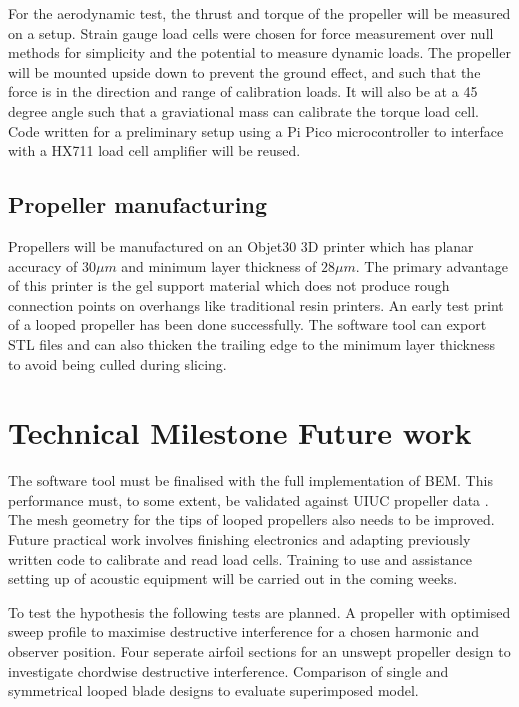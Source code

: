 \documentclass{article}
\begin{document}
For the aerodynamic test, the thrust and torque of the propeller will be measured on a setup.
Strain gauge load cells were chosen for force measurement over null methods for simplicity and the potential to measure dynamic loads.
The propeller will be mounted upside down to prevent the ground effect, and such that the force is in the direction and range of calibration loads.
It will also be at a 45 degree angle such that a graviational mass can calibrate the torque load cell.
Code written for a preliminary setup using a Pi Pico microcontroller to interface with a HX711 load cell amplifier will be reused.

\subsection{Propeller manufacturing}
Propellers will be manufactured on an Objet30 3D printer which has planar accuracy of $30\mu m$ and minimum layer thickness of $28 \mu m$.
The primary advantage of this printer is the gel support material which does not produce rough connection points on overhangs like traditional resin printers.
An early test print of a looped propeller has been done successfully.
The software tool can export STL files and can also thicken the trailing edge to the minimum layer thickness to avoid being culled during slicing.

\section{Technical Milestone Future work}
The software tool must be finalised with the full implementation of BEM.
This performance must, to some extent, be validated against UIUC propeller data \cite{UIUC_database}.
The mesh geometry for the tips of looped propellers also needs to be improved.
Future practical work involves finishing electronics and adapting previously written code to calibrate and read load cells.
Training to use and assistance setting up of acoustic equipment will be carried out in the coming weeks.

To test the hypothesis the following tests are planned.
A propeller with optimised sweep profile to maximise destructive interference for a chosen harmonic and observer position.
Four seperate airfoil sections for an unswept propeller design to investigate chordwise destructive interference.
Comparison of single and symmetrical looped blade designs to evaluate superimposed model.

\newpage
\end{document}

